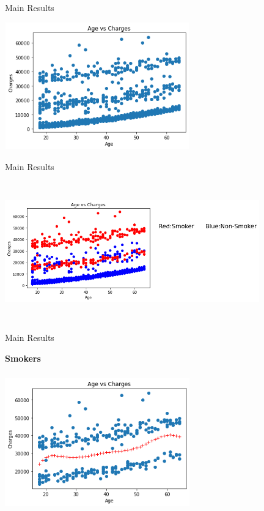 \documentclass[handout,9pt]{beamer}
\numberwithin{theorem}{section}
\begin{document}
\begin{frame}{Main Results}
	\begin{spacing}{1}
		\begin{center}
			\includegraphics[height=5.5cm,width=8cm]{work2}\\
		\end{center}
		\hspace{3.75cm}{Correlation between Age and Charges = 0.2999}
	\end{spacing}
\end{frame}

\begin{frame}{Main Results}
	\begin{spacing}{1}
		\begin{center}
			\includegraphics[height=6cm,width=11cm]{work4}
		\end{center}
	\end{spacing}
\end{frame}
\begin{frame}{Main Results}
\begin{spacing}{1}
	\textbf{Smokers}
	\begin{center}
		\includegraphics[height=6cm, width=8cm]{work6}
	\end{center}
\end{spacing}
\end{frame}
\end{document}
